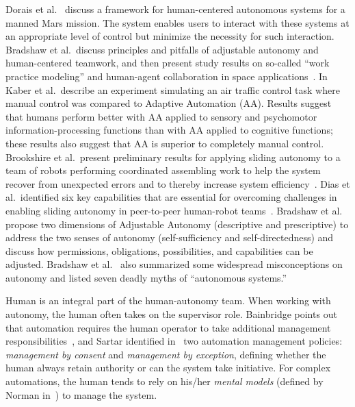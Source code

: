 \documentclass[journal]{IEEEtran}
\begin{document}
Dorais et al.\ \cite{Dorais1998AdjustableAutonomy} discuss a framework for human-centered autonomous systems for a manned Mars mission. The system enables users to interact with these systems at an appropriate level of control but minimize the necessity for such interaction. Bradshaw et al.\ discuss principles and pitfalls of adjustable autonomy and human-centered teamwork, and then present study results on so-called ``work practice modeling'' and human-agent collaboration in space applications~\cite{Bradshaw2003AdjustableAutonomy}. In~\cite{Kaber2005Adaptive} Kaber et al.\ describe an experiment simulating an air traffic control task where manual control was compared to Adaptive Automation (AA). Results suggest that humans perform better with AA applied to sensory and psychomotor information-processing functions than with AA applied to cognitive functions; these results also suggest that AA is superior to completely manual control. Brookshire et al.\ present preliminary results for applying sliding autonomy to a team of robots performing coordinated assembling work to help the system recover from unexpected errors and to thereby increase system efficiency~\cite{Brookshire2004Preliminary}. Dias et al.\ identified six key capabilities that are essential for overcoming challenges in enabling sliding autonomy in peer-to-peer human-robot teams~\cite{Dias2008SlidingAutonomy}. Bradshaw et al.\ \cite{Bradshaw2004Dimensions} propose two dimensions of Adjustable Autonomy (descriptive and prescriptive) to address the two senses of autonomy (self-sufficiency and self-directedness) and discuss how permissions, obligations, possibilities, and capabilities can be adjusted. Bradshaw et al.\ \cite{Bradshaw2013Seven} also summarized some widespread misconceptions on autonomy and listed seven deadly myths of ``autonomous systems.''

Human is an integral part of the human-autonomy team. When working with autonomy, the human often takes on the supervisor role. Bainbridge points out that automation requires the human operator to take additional management responsibilities~\cite{Bainbridge1983Ironies}, and Sartar identified in~\cite{Sarter1998Making} two automation management policies: \textit{management by consent} and \textit{management by exception}, defining whether the human always retain authority or can the system take initiative. For complex automations, the human tends to rely on his/her \textit{mental models} (defined by Norman in~\cite{Norman1983Some}) to manage the system. 
\end{document}
